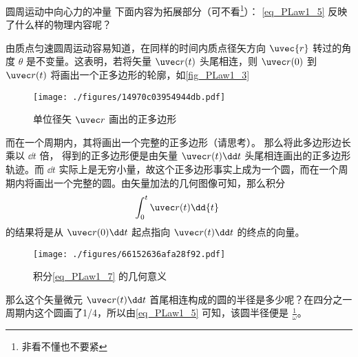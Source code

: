 \begin{example}{圆周运动中向心力的冲量}
下面内容为拓展部分（可不看\footnote{非看不懂也不要紧}）：
\autoref{eq_PLaw1_5} 反映了什么样的物理内容呢？

由质点匀速圆周运动容易知道，在同样的时间内质点径矢方向 $\uvec{r}$ 转过的角度 $\theta$ 是不变量。这表明，若将矢量 $\uvec r(t)$ 头尾相连，则 $\uvec r(0)$ 到 $\uvec r(t)$ 将画出一个正多边形的轮廓，如\autoref{fig_PLaw1_3} 
\begin{figure}[ht]
\centering
\texttt{[image: ./figures/14970c03954944db.pdf]}
\caption{单位径矢 $\uvec r$ 画出的正多边形} \label{fig_PLaw1_3}
\end{figure}
而在一个周期内，其将画出一个完整的正多边形（请思考）。
那么将此多边形边长乘以 $\dd t$ 倍， 得到的正多边形便是由矢量 $\uvec r(t)\dd t$ 头尾相连画出的正多边形轨迹。而 $\dd t$ 实际上是无穷小量，故这个正多边形事实上成为一个圆，而在一个周期内将画出一个完整的圆。由矢量加法的几何图像可知，那么积分
\begin{equation}\label{eq_PLaw1_7}
\int_{0}^{t}\uvec r(t) \dd{t}~
\end{equation}
的结果将是从 $\uvec r(0)\dd t$ 起点指向 $\uvec r(t)\dd t$ 的终点的向量。
\begin{figure}[ht]
\centering
\texttt{[image: ./figures/66152636afa28f92.pdf]}
\caption{积分\autoref{eq_PLaw1_7} 的几何意义} \label{fig_PLaw1_4}
\end{figure}
那么这个矢量微元 $\uvec r(t)\dd t$ 首尾相连构成的圆的半径是多少呢？在四分之一周期内这个圆画了1/4，所以由\autoref{eq_PLaw1_5} 可知，该圆半径便是 $\frac{1}{\omega}$。
\end{example}
